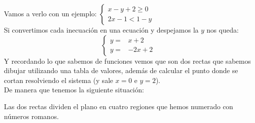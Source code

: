 \documentclass[a4paper,11pt,answers]{exam}
\begin{document}
Vamos a verlo con un ejemplo: $
\begin{cases}
  x-y +2 \geq 0\\
  2x-1 < 1-y 
\end{cases}
$\\
Si convertimos cada inecuación en una ecuación y despejamos la $y$ nos queda:
\[
  \begin{cases}
    y =& x+2\\
    y=&-2x + 2
  \end{cases}
\]
Y recordando lo que sabemos de funciones vemos que son dos rectas que sabemos dibujar utilizando una tabla
de valores, además de calcular el punto donde se cortan resolviendo el sistema (y sale $x=0$ e $y = 2$).\\
De manera que tenemos la siguiente situación:
\begin{center}
\end{center}
Las dos rectas dividen el plano en cuatro regiones que hemos numerado con números romanos.\\
\end{document}
